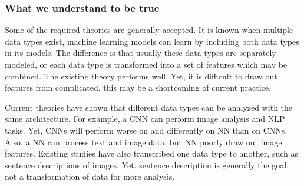 \subsubsection{What we understand to be true}

Some of the required theories are generally accepted. It is known when multiple data types exist, machine learning models can learn by including both data types in its models.  The difference is that usually these data types are separately modeled, or each data type is transformed into a set of features which may be combined.  The existing theory performs well.  Yet, it is difficult to draw out features from complicated, this may be a shortcoming of current practice.

Current theories have shown that different data types can be analyzed with the same architecture.  For example, a CNN can perform image analysis and NLP tasks.  Yet, CNNs will perform worse on and differently on NN than on CNNs.  Also, a NN can process text and image data, but NN poorly draw out image features.  Existing studies have also transcribed one data type to another, such as sentence descriptions of images.  Yet, sentence description is generally the goal, not a transformation of data for more analysis. 
